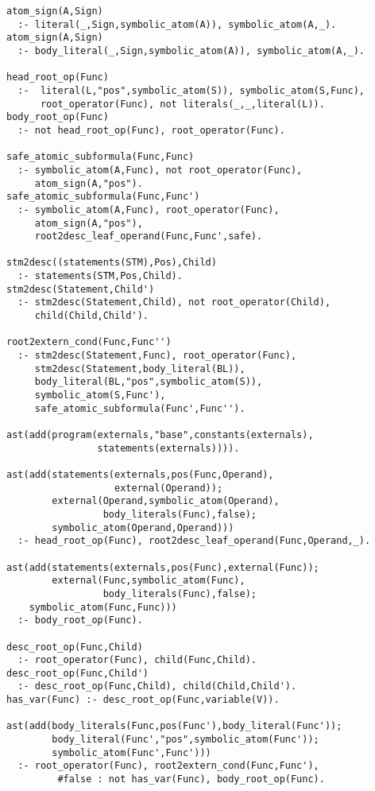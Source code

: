 \begin{center}
\begin{minipage}{\linewidth}
  \begin{lstlisting}[]
atom_sign(A,Sign)
  :- literal(_,Sign,symbolic_atom(A)), symbolic_atom(A,_).
atom_sign(A,Sign)
  :- body_literal(_,Sign,symbolic_atom(A)), symbolic_atom(A,_).

head_root_op(Func)
  :-  literal(L,"pos",symbolic_atom(S)), symbolic_atom(S,Func),
      root_operator(Func), not literals(_,_,literal(L)).
body_root_op(Func) 
  :- not head_root_op(Func), root_operator(Func).

safe_atomic_subformula(Func,Func) 
  :- symbolic_atom(A,Func), not root_operator(Func), 
     atom_sign(A,"pos").
safe_atomic_subformula(Func,Func')
  :- symbolic_atom(A,Func), root_operator(Func), 
     atom_sign(A,"pos"), 
     root2desc_leaf_operand(Func,Func',safe).

stm2desc((statements(STM),Pos),Child) 
  :- statements(STM,Pos,Child).
stm2desc(Statement,Child') 
  :- stm2desc(Statement,Child), not root_operator(Child), 
     child(Child,Child').

root2extern_cond(Func,Func'')
  :- stm2desc(Statement,Func), root_operator(Func), 
     stm2desc(Statement,body_literal(BL)), 
     body_literal(BL,"pos",symbolic_atom(S)), 
     symbolic_atom(S,Func'), 
     safe_atomic_subformula(Func',Func'').

ast(add(program(externals,"base",constants(externals),
                statements(externals)))).

ast(add(statements(externals,pos(Func,Operand),
                   external(Operand));
        external(Operand,symbolic_atom(Operand),
                 body_literals(Func),false);
        symbolic_atom(Operand,Operand)))
  :- head_root_op(Func), root2desc_leaf_operand(Func,Operand,_).

ast(add(statements(externals,pos(Func),external(Func));
        external(Func,symbolic_atom(Func),
                 body_literals(Func),false);
	symbolic_atom(Func,Func)))
  :- body_root_op(Func).

desc_root_op(Func,Child) 
  :- root_operator(Func), child(Func,Child).
desc_root_op(Func,Child')
  :- desc_root_op(Func,Child), child(Child,Child').
has_var(Func) :- desc_root_op(Func,variable(V)).

ast(add(body_literals(Func,pos(Func'),body_literal(Func'));
        body_literal(Func',"pos",symbolic_atom(Func'));
        symbolic_atom(Func',Func')))
  :- root_operator(Func), root2extern_cond(Func,Func'), 
		 #false : not has_var(Func), body_root_op(Func).
\end{lstlisting}
\end{minipage}
\end{center}
